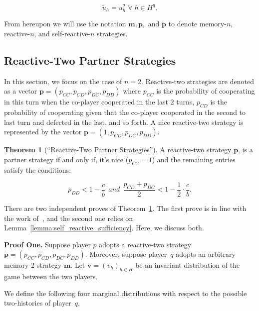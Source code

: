 \documentclass{article}
\theoremstyle{definition}
\newtheorem{theorem}{Theorem}[section]
\begin{document}
\begin{equation}
  \tilde{u}_{h} = u^q_{h} \; \forall \; h \in H^q.
\end{equation}

From hereupon we will use the notation $\mathbf{m}, \mathbf{p}, \text{ and }
\mathbf{\tilde{p}}$ to denote memory-$n$, reactive-$n$, and self-reactive-$n$
strategies.

\subsection{Reactive-Two Partner Strategies}

In this section, we focus on the case of $n=2$. Reactive-two strategies are denoted as a vector
$\mathbf{p}=(p_{CC}, p_{CD}, p_{DC}, p_{DD})$ where $p_{CC}$ is the
probability of cooperating in this turn when the co-player cooperated in the
last 2 turns, $p_{CD}$ is the probability of cooperating given that the
co-player cooperated in the second to last turn and defected in the last, and so
forth. A nice reactive-two strategy is represented by the vector $\mathbf{p}=(1,
p_{CD}, p_{DC}, p_{DD})$.

\begin{theorem}[``Reactive-Two Partner Strategies'']\label{theorem:reactive_two_partner_strategies}
A reactive-two strategy $\mathbf{p}$, is a partner strategy if and only if,
it's nice ($p_{CC} = 1$) and the remaining entries satisfy the conditions:

\begin{equation}\label{eq:two_bit_conditions}
  \displaystyle p_{DD} < 1\!-\! \frac{c}{b}  ~~and~~ \displaystyle \frac{p_{CD} + p_{DC}}{2} < 1- \frac{1}{2} \cdot \frac{c}{b}.
\end{equation}
\end{theorem}

There are two independent proves of
Theorem~\ref{theorem:reactive_two_partner_strategies}. The first prove is
in line with the work of~\citep{akin:EGADS:2016}, and the second one relies on
Lemma~\ref{lemma:self_reactive_sufficiency}. Here, we discuss both.

{\bf Proof One.} Suppose player $p$ adopts a
reactive-two strategy $\mathbf{p}\!=\!(p_{CC},p_{CD}, p_{DC}, p_{DD})$.
Moreover, suppose player~$q$ adopts an arbitrary memory-2 strategy $\mathbf{m}$.
Let $\mathbf{v}=(v_h)_{h\in H}$ be an invariant distribution of the game between
the two players.

We define the following four marginal distributions with respect to the possible two-histories of player~$q$,
\end{document}
